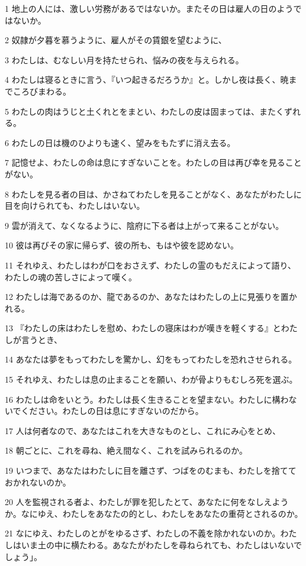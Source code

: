 \par 1 地上の人には、激しい労務があるではないか。またその日は雇人の日のようではないか。
\par 2 奴隷が夕暮を慕うように、雇人がその賃銀を望むように、
\par 3 わたしは、むなしい月を持たせられ、悩みの夜を与えられる。
\par 4 わたしは寝るときに言う、『いつ起きるだろうか』と。しかし夜は長く、暁までころびまわる。
\par 5 わたしの肉はうじと土くれとをまとい、わたしの皮は固まっては、またくずれる。
\par 6 わたしの日は機のひよりも速く、望みをもたずに消え去る。
\par 7 記憶せよ、わたしの命は息にすぎないことを。わたしの目は再び幸を見ることがない。
\par 8 わたしを見る者の目は、かさねてわたしを見ることがなく、あなたがわたしに目を向けられても、わたしはいない。
\par 9 雲が消えて、なくなるように、陰府に下る者は上がって来ることがない。
\par 10 彼は再びその家に帰らず、彼の所も、もはや彼を認めない。
\par 11 それゆえ、わたしはわが口をおさえず、わたしの霊のもだえによって語り、わたしの魂の苦しさによって嘆く。
\par 12 わたしは海であるのか、龍であるのか、あなたはわたしの上に見張りを置かれる。
\par 13 『わたしの床はわたしを慰め、わたしの寝床はわが嘆きを軽くする』とわたしが言うとき、
\par 14 あなたは夢をもってわたしを驚かし、幻をもってわたしを恐れさせられる。
\par 15 それゆえ、わたしは息の止まることを願い、わが骨よりもむしろ死を選ぶ。
\par 16 わたしは命をいとう。わたしは長く生きることを望まない。わたしに構わないでください。わたしの日は息にすぎないのだから。
\par 17 人は何者なので、あなたはこれを大きなものとし、これにみ心をとめ、
\par 18 朝ごとに、これを尋ね、絶え間なく、これを試みられるのか。
\par 19 いつまで、あなたはわたしに目を離さず、つばをのむまも、わたしを捨てておかれないのか。
\par 20 人を監視される者よ、わたしが罪を犯したとて、あなたに何をなしえようか。なにゆえ、わたしをあなたの的とし、わたしをあなたの重荷とされるのか。
\par 21 なにゆえ、わたしのとがをゆるさず、わたしの不義を除かれないのか。わたしはいま土の中に横たわる。あなたがわたしを尋ねられても、わたしはいないでしょう」。

